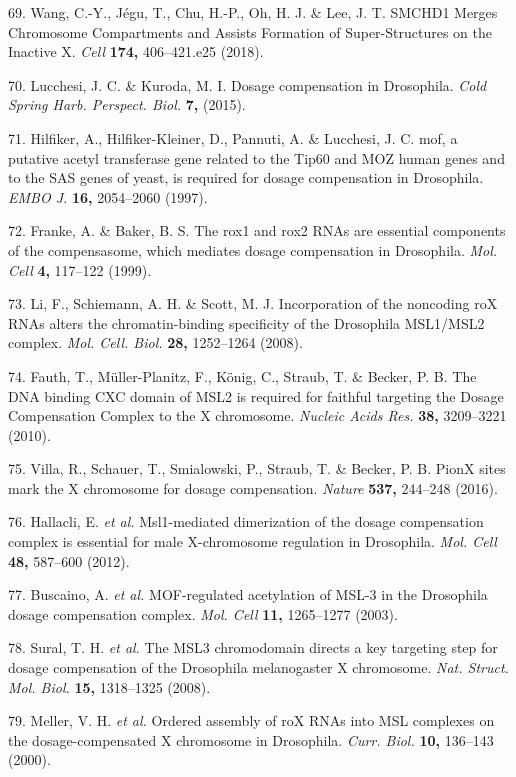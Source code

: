 \documentclass[11pt,twoside]{MPIthesis}
\theoremstyle{definition}
\theoremstyle{definition}
\theoremstyle{definition}
\theoremstyle{remark}
\begin{document}
69. Wang, C.-Y., Jégu, T., Chu, H.-P., Oh, H. J. \& Lee, J. T. SMCHD1
Merges Chromosome Compartments and Assists Formation of Super-Structures
on the Inactive X. \emph{Cell} \textbf{174,} 406--421.e25 (2018).

70. Lucchesi, J. C. \& Kuroda, M. I. Dosage compensation in Drosophila.
\emph{Cold Spring Harb. Perspect. Biol.} \textbf{7,} (2015).

71. Hilfiker, A., Hilfiker-Kleiner, D., Pannuti, A. \& Lucchesi, J. C.
mof, a putative acetyl transferase gene related to the Tip60 and MOZ
human genes and to the SAS genes of yeast, is required for dosage
compensation in Drosophila. \emph{EMBO J.} \textbf{16,} 2054--2060
(1997).

72. Franke, A. \& Baker, B. S. The rox1 and rox2 RNAs are essential
components of the compensasome, which mediates dosage compensation in
Drosophila. \emph{Mol. Cell} \textbf{4,} 117--122 (1999).

73. Li, F., Schiemann, A. H. \& Scott, M. J. Incorporation of the
noncoding roX RNAs alters the chromatin-binding specificity of the
Drosophila MSL1/MSL2 complex. \emph{Mol. Cell. Biol.} \textbf{28,}
1252--1264 (2008).

74. Fauth, T., Müller-Planitz, F., König, C., Straub, T. \& Becker, P.
B. The DNA binding CXC domain of MSL2 is required for faithful targeting
the Dosage Compensation Complex to the X chromosome. \emph{Nucleic Acids
Res.} \textbf{38,} 3209--3221 (2010).

75. Villa, R., Schauer, T., Smialowski, P., Straub, T. \& Becker, P. B.
PionX sites mark the X chromosome for dosage compensation. \emph{Nature}
\textbf{537,} 244--248 (2016).

76. Hallacli, E. \emph{et al.} Msl1-mediated dimerization of the dosage
compensation complex is essential for male X-chromosome regulation in
Drosophila. \emph{Mol. Cell} \textbf{48,} 587--600 (2012).

77. Buscaino, A. \emph{et al.} MOF-regulated acetylation of MSL-3 in the
Drosophila dosage compensation complex. \emph{Mol. Cell} \textbf{11,}
1265--1277 (2003).

78. Sural, T. H. \emph{et al.} The MSL3 chromodomain directs a key
targeting step for dosage compensation of the Drosophila melanogaster X
chromosome. \emph{Nat. Struct. Mol. Biol.} \textbf{15,} 1318--1325
(2008).

79. Meller, V. H. \emph{et al.} Ordered assembly of roX RNAs into MSL
complexes on the dosage-compensated X chromosome in Drosophila.
\emph{Curr. Biol.} \textbf{10,} 136--143 (2000).
\end{document}
